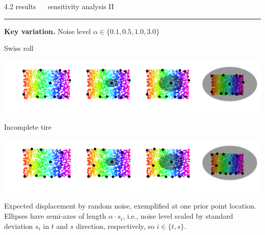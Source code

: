 \documentclass[11pt, compress, t, notes = noshow, xcolor = table, 
aspectratio = 1610]{beamer}
\begin{document}
\LARGE
\begin{frame}{\textcolor{gray!90}{4.2 results} ~~ sensitivity analysis II}
\normalsize
\vspace{-0.5cm}
\noindent \textcolor{gray!90}{\rule{\textwidth}{1pt}}
\smallskip

\textbf{Key variation.} Noise level $\alpha \in \{0.1, 0.5, 1.0, 3.0\}$ 

\vspace{0.3cm}

\begin{minipage}[c]{0.2\textwidth}
  Swiss roll
\end{minipage}%
\begin{minipage}[c]{0.8\textwidth}
  \includegraphics[trim = 40 30 0 0, clip, %
    width = \textwidth]{figures/sensitivity_noise_key_swiss}
\end{minipage}

\vspace{0.3cm}   

\begin{minipage}[c]{0.2\textwidth}
  Incomplete tire
\end{minipage}%
\begin{minipage}[c]{0.8\textwidth}
  \includegraphics[trim = 40 30 0 0, clip, %
    width = \textwidth]{figures/sensitivity_noise_key_tire}
\end{minipage}

\vfill

\scriptsize
Expected displacement by random noise, exemplified at one prior point location. 
\\
Ellipses have semi-axes of length $\alpha \cdot s_i$, i.e., noise level scaled 
by standard deviation $s_i$ in $t$ and $s$ direction, respectively, so
$i \in \{t, s\}$.

\end{frame}
\end{document}
